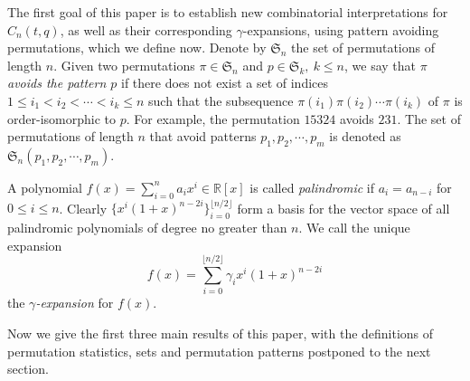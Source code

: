 \documentclass[12pt,reqno]{amsart}
\numberwithin{equation}{section}
\theoremstyle{plain}
\theoremstyle{definition}
\def\R{\mathbb{R}}
\def\S{\mathfrak{S}}
\def\exc{\mathsf{exc}}
\def\dd{\mathsf{dd}}
\def\des{\mathsf{des}}
\def\inv{\mathsf{inv}}
\begin{document}
The first goal of this paper is to establish new combinatorial interpretations for $C_n(t,q)$, as well as their corresponding $\gamma$-expansions, using pattern avoiding permutations, which we define now.
Denote by $\S_n$ the set of permutations of length $n$. Given two permutations $\pi\in\S_n$ and $p\in\S_k,\:k\leq n$, we say that \emph{$\pi$ avoids the pattern $p$} if there does not exist a set of indices $1\le i_1<i_2<\cdots<i_k\le n$  such that the subsequence $\pi(i_1)\pi(i_2)\cdots\pi(i_k)$ of $\pi$ is order-isomorphic to $p$. For example, the permutation $15324$ avoids $231$. The set of permutations of length $n$ that avoid patterns $p_1,p_2,\cdots,p_m$ is denoted as $\S_n(p_1,p_2,\cdots,p_m)$.

A polynomial $f(x)=\sum_{i=0}^{n} a_i x^i\in\R[x]$ is called \emph{palindromic} if $a_i=a_{n-i}$ for $0\le i \le n$. Clearly $\{x^i(1+x)^{n-2i}\}_{i=0}^{\lfloor n/2 \rfloor}$ form a basis for the vector space of all palindromic polynomials of degree no greater than $n$. We call the unique expansion
$$
f(x)=\sum_{i=0}^{\lfloor n/2 \rfloor}\gamma_ix^i(1+x)^{n-2i}
$$
 the \emph{$\gamma$-expansion} for $f(x)$.



%



Now we give the first three main results of this paper, with the definitions of permutation statistics, sets and permutation patterns postponed to the next section.

\end{document}
